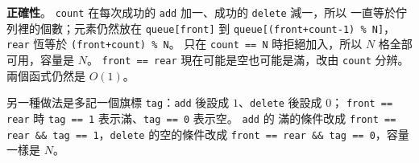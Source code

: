 \begin{pastsoln}
\textbf{正確性}。 \texttt{count} 在每次成功的 \texttt{add} 加一、成功的 \texttt{delete} 減一，所以
一直等於佇列裡的個數；元素仍然放在 \texttt{queue[front]} 到 \texttt{queue[(front+count-1) \% N]}，
\texttt{rear} 恆等於 \texttt{(front+count) \% N}。 只在 \texttt{count == N} 時拒絕加入，所以
$N$ 格全部可用，容量是 $N$。 \texttt{front == rear} 現在可能是空也可能是滿，改由 \texttt{count}
分辨。 兩個函式仍然是 $O(1)$。

另一種做法是多記一個旗標 \texttt{tag}：\texttt{add} 後設成 $1$、\texttt{delete} 後設成 $0$；
\texttt{front == rear} 時 \texttt{tag == 1} 表示滿、\texttt{tag == 0} 表示空。 \texttt{add} 的
滿的條件改成 \texttt{front == rear \&\& tag == 1}，\texttt{delete} 的空的條件改成
\texttt{front == rear \&\& tag == 0}，容量一樣是 $N$。
\end{pastsoln}
